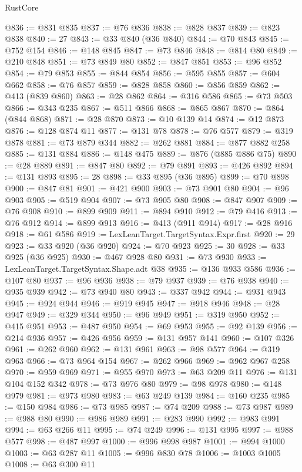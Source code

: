 \begin{lexlean}{RustCore}
\begin{coremodule}
@836 := @831 @835
@837 := @76 @836
@838 := @828 @837
@839 := @823 @838
@840 := 27
@843 := @33 @840 (@36 @840)
@844 := @70 @843
@845 := @752 @154
@846 := @148 @845
@847 := @73 @846
@848 := @814 @80
@849 := @210 @848
@851 := @73 @849 @80
@852 := @847 @851
@853 := @96 @852
@854 := @79 @853
@855 := @844 @854
@856 := @595 @855
@857 := @604 @662
@858 := @76 @857
@859 := @828 @858
@860 := @856 @859
@862 := @413 (@839 @860)
@863 := @28 @862
@864 := @316 @586
@865 := @73 @503
@866 := @343 @235
@867 := @511 @866
@868 := @865 @867
@870 := @864 (@844 @868)
@871 := @28 @870
@873 := @10 @139 @14
@874 := @12 @873
@876 := @128 @874 @11
@877 := @131 @78
@878 := @76 @577
@879 := @319 @878
@881 := @73 @879 @344
@882 := @262 @881
@884 := @877 @882 @258
@885 := @131 @884
@886 := @148 @475
@889 := @876 (@885 @886 @75)
@890 := @28 @889
@891 := @847 @80
@892 := @79 @891
@893 := @426 @892
@894 := @131 @893
@895 := 28
@898 := @33 @895 (@36 @895)
@899 := @70 @898
@900 := @847 @81
@901 := @421 @900
@903 := @73 @901 @80
@904 := @96 @903
@905 := @519 @904
@907 := @73 @905 @80
@908 := @847 @907
@909 := @76 @908
@910 := @899 @909
@911 := @894 @910
@912 := @79 @416
@913 := @76 @912
@914 := @899 @913
@916 := @413 (@911 @914)
@917 := @28 @916
@918 := @61 @586
@919 := LexLeanTarget.TargetSyntax.Expr.first
@920 := 29
@923 := @33 @920 (@36 @920)
@924 := @70 @923
@925 := 30
@928 := @33 @925 (@36 @925)
@930 := @467 @928 @80
@931 := @73 @930
@933 := LexLeanTarget.TargetSyntax.Shape.adt @38
@935 := @136 @933 @586
@936 := @107 @80
@937 := @96 @936
@938 := @79 @937
@939 := @76 @938
@940 := @935 @939
@942 := @73 @940 @80
@943 := @337 @942
@944 := @931 @943
@945 := @924 @944
@946 := @919 @945
@947 := @918 @946
@948 := @28 @947
@949 := @329 @344
@950 := @96 @949
@951 := @319 @950
@952 := @415 @951
@953 := @487 @950
@954 := @69 @953
@955 := @92 @139
@956 := @214 @936
@957 := @426 @956
@959 := @131 @957 @141
@960 := @107 @326
@961 := @262 @960
@962 := @131 @961
@963 := @98 @577
@964 := @319 @963
@966 := @73 @964 @154
@967 := @262 @966
@969 := @962 @967 @258
@970 := @959 @969
@971 := @955 @970
@973 := @63 @209 @11
@976 := @131 @104 @152 @342
@978 := @73 @976 @80
@979 := @98 @978
@980 := @148 @979
@981 := @973 @980
@983 := @63 @249 @139
@984 := @160 @235
@985 := @150 @984
@986 := @73 @985
@987 := @74 @209
@988 := @73 @987
@989 := @988 @80
@990 := @986 @989
@991 := @283 @990
@992 := @983 @991
@994 := @63 @266 @11
@995 := @74 @249
@996 := @131 @995
@997 := @988 @577
@998 := @487 @997
@1000 := @996 @998 @987
@1001 := @994 @1000
@1003 := @63 @287 @11
@1005 := @996 @830 @78
@1006 := @1003 @1005
@1008 := @63 @300 @11

\end{coremodule}
\end{lexlean}
